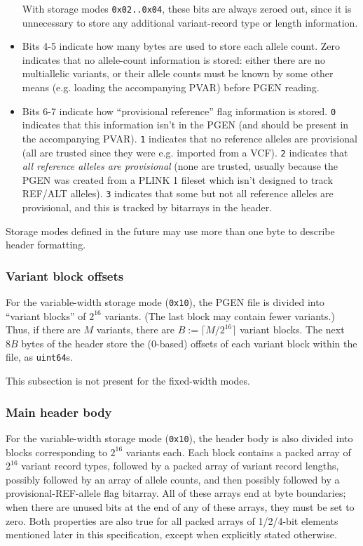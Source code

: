 \documentclass[8pt]{article}
\begin{document}
\begin{itemize}
  With storage modes \texttt{0x02..0x04}, these bits are always zeroed out,
  since it is unnecessary to store any additional variant-record type or length
  information.
  \item Bits 4-5 indicate how many bytes are used to store each allele count.
    Zero indicates that no allele-count information is stored: either there are
    no multiallelic variants, or their allele counts must be known by some
    other means (e.g. loading the accompanying PVAR) before PGEN reading.
  \item Bits 6-7 indicate how ``provisional reference'' flag information is
    stored.  \texttt{0} indicates that this information isn't in the PGEN (and
    should be present in the accompanying PVAR).  \texttt{1} indicates that
    no reference alleles are provisional (all are trusted since they were e.g.
    imported from a VCF).  \texttt{2} indicates that \textit{all reference
    alleles are provisional} (none are trusted, usually because the PGEN was
    created from a PLINK 1 fileset which isn't designed to track REF/ALT
    alleles).  \texttt{3} indicates that some but not all reference alleles are
    provisional, and this is tracked by bitarrays in the header.
\end{itemize}

Storage modes defined in the future may use more than one byte to describe
header formatting.

\subsubsection{Variant block offsets}

For the variable-width storage mode (\texttt{0x10}), the PGEN file is divided
into ``variant blocks'' of $2^{16}$ variants.  (The last block may contain
fewer variants.) Thus, if there are $M$ variants, there are
$B := \lceil M/2^{16}\rceil$ variant blocks.  The next $8B$ bytes of the header
store the (0-based) offsets of each variant block within the file, as
\texttt{uint64}s.

This subsection is not present for the fixed-width modes.

\subsubsection{Main header body}

For the variable-width storage mode (\texttt{0x10}), the header body is also
divided into blocks corresponding to $2^{16}$ variants each.  Each block
contains a packed array of $2^{16}$ variant record types, followed by a packed
array of variant record lengths, possibly followed by an array of allele
counts, and then possibly followed by a provisional-REF-allele flag bitarray.
All of these arrays end at byte boundaries; when there are unused bits at the
end of any of these arrays, they must be set to zero.  Both properties are also
true for all packed arrays of 1/2/4-bit elements mentioned later in this
specification, except when explicitly stated otherwise.
\end{document}
